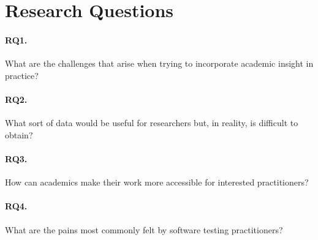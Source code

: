\section{Research Questions}\label{sec:ind_rqs}

\paragraph{RQ1. } What are the challenges that arise when trying to incorporate academic insight in practice?
\paragraph{RQ2. } What sort of data would be useful for researchers but, in reality, is difficult to obtain?
\paragraph{RQ3. } How can academics make their work more accessible for interested practitioners?
\paragraph{RQ4. } What are the pains most commonly felt by software testing practitioners?
